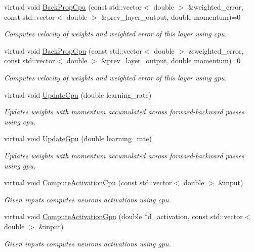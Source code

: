 \begin{DoxyCompactItemize}
virtual void \hyperlink{classneuralnet_1_1Layer_acb789462daab9227ff4ce6f7332bd38c}{Back\+Prop\+Cpu} (const std\+::vector$<$ double $>$ \&weighted\+\_\+error, const std\+::vector$<$ double $>$ \&prev\+\_\+layer\+\_\+output, double momentum)=0
\begin{DoxyCompactList}\small\item\em Computes velocity of weights and weighted error of this layer using cpu. \end{DoxyCompactList}\item 
virtual void \hyperlink{classneuralnet_1_1Layer_aa81e9cfb0eaf5e17b38e011c4f56f042}{Back\+Prop\+Gpu} (const std\+::vector$<$ double $>$ \&weighted\+\_\+error, const std\+::vector$<$ double $>$ \&prev\+\_\+layer\+\_\+output, double momentum)=0
\begin{DoxyCompactList}\small\item\em Computes velocity of weights and weighted error of this layer using gpu. \end{DoxyCompactList}\item 
virtual void \hyperlink{classneuralnet_1_1Layer_a24af23aba6bd257f90344d1c3d6d38b8}{Update\+Cpu} (double learning\+\_\+rate)
\begin{DoxyCompactList}\small\item\em Updates weights with momentum accumulated across forward-\/backward passes using cpu. \end{DoxyCompactList}\item 
virtual void \hyperlink{classneuralnet_1_1Layer_af7520597d321aae360329b70f9476073}{Update\+Gpu} (double learning\+\_\+rate)
\begin{DoxyCompactList}\small\item\em Updates weights with momentum accumulated across forward-\/backward passes using gpu. \end{DoxyCompactList}\item 
virtual void \hyperlink{classneuralnet_1_1Layer_a6e8f59ebde8c44d72004ba0d563b01c6}{Compute\+Activation\+Cpu} (const std\+::vector$<$ double $>$ \&input)
\begin{DoxyCompactList}\small\item\em Given inputs computes neurons\textquotesingle{} activations using cpu. \end{DoxyCompactList}\item 
virtual void \hyperlink{classneuralnet_1_1Layer_a496fe8418591fde8ea2f151ae0e8f274}{Compute\+Activation\+Gpu} (double $\ast$d\+\_\+activation, const std\+::vector$<$ double $>$ \&input)
\begin{DoxyCompactList}\small\item\em Given inputs computes neurons\textquotesingle{} activations using gpu. \end{DoxyCompactList}\item 

\end{DoxyCompactItemize}
